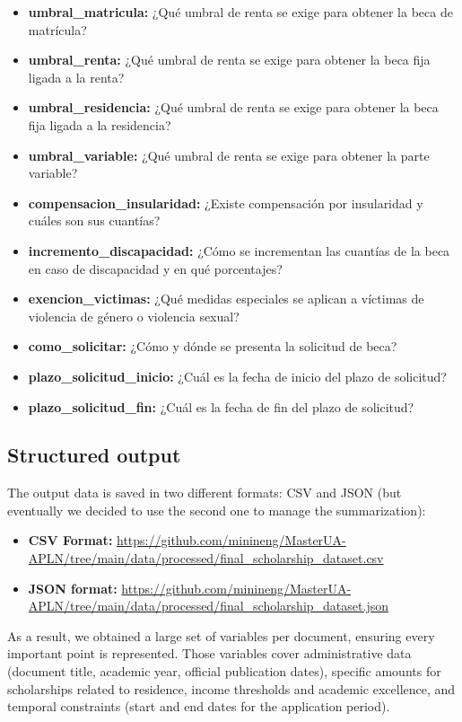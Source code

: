 \documentclass{article}
\begin{document}
\begin{itemize}
\item \textbf{umbral\_matricula:} ¿Qué umbral de renta se exige para obtener la beca de matrícula?
\item \textbf{umbral\_renta:} ¿Qué umbral de renta se exige para obtener la beca fija ligada a la renta?
\item \textbf{umbral\_residencia:} ¿Qué umbral de renta se exige para obtener la beca fija ligada a la residencia?
\item \textbf{umbral\_variable:} ¿Qué umbral de renta se exige para obtener la parte variable?
\item \textbf{compensacion\_insularidad:} ¿Existe compensación por insularidad y cuáles son sus cuantías?
\item \textbf{incremento\_discapacidad:} ¿Cómo se incrementan las cuantías de la beca en caso de discapacidad y en qué porcentajes?
\item \textbf{exencion\_victimas:} ¿Qué medidas especiales se aplican a víctimas de violencia de género o violencia sexual?
\item \textbf{como\_solicitar:} ¿Cómo y dónde se presenta la solicitud de beca?
\item \textbf{plazo\_solicitud\_inicio:} ¿Cuál es la fecha de inicio del plazo de solicitud?
\item \textbf{plazo\_solicitud\_fin:} ¿Cuál es la fecha de fin del plazo de solicitud?
\end{itemize}

\subsection{Structured output}

The output data is saved in two different formats: CSV and JSON (but eventually we decided to use the second one to manage the summarization):




\begin{itemize}
  
\item \textbf{CSV Format:} \url{https://github.com/minineng/MasterUA-APLN/tree/main/data/processed/final_scholarship_dataset.csv}
\item \textbf{JSON format:} \url{https://github.com/minineng/MasterUA-APLN/tree/main/data/processed/final_scholarship_dataset.json}
\end{itemize}

As a result, we obtained a large set of variables per document, ensuring every important point is represented. Those variables cover administrative data (document title, academic year, official publication dates), specific amounts for scholarships related to residence, income thresholds and academic excellence, and temporal constraints (start and end dates for the application period).
\end{document}
